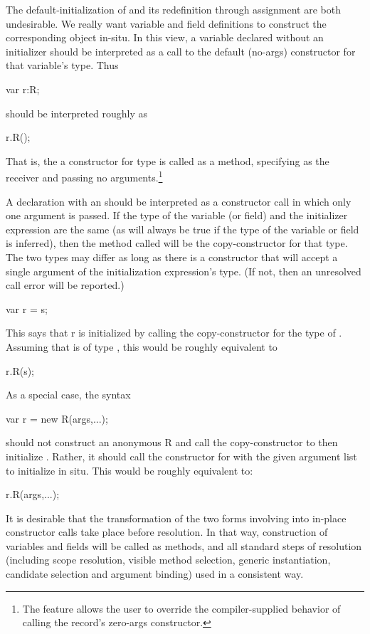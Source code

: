 The default-initialization of  and its
redefinition through assignment are both undesirable.  We really want variable and field
definitions to construct the corresponding object in-situ.  In this view, a variable
declared without an initializer should be interpreted as a call to the default (no-args)
constructor for that variable's type.  Thus
\begin{chapel}
var r:R;
\end{chapel}
\noindent
should be interpreted roughly as
\begin{chapel}
r.R();
\end{chapel}
That is, the a constructor for type  is called as a method, specifying  as
the receiver and passing no arguments.\footnote{The  feature
  allows the user to override the compiler-supplied behavior of calling the record's
  zero-args constructor.}

A declaration with an  should be interpreted as a constructor call
in which only one argument is passed.  If the type of the variable (or field) and the initializer
expression are the same (as will always be true if the type of the variable or field is
inferred), then the method called will be the copy-constructor for that type.  The two
types may differ as long as there is a constructor that will accept a single argument of
the initialization expression's type.  (If not, then an unresolved call error will be
reported.)
\begin{chapel}
var r = s;
\end{chapel}
This says that r is initialized by calling the copy-constructor for the type of .
Assuming that  is of type , this would be roughly equivalent to
\begin{chapel}
r.R(s);
\end{chapel}

As a special case, the syntax
\begin{chapel}
var r = new R(args,...);
\end{chapel}
\noindent
should not construct an anonymous R and call the copy-constructor to then initialize
.  Rather, it should call the constructor for  with the given argument
list to initialize  in situ.  This would be roughly equivalent to:
\begin{chapel}
r.R(args,...);
\end{chapel}

It is desirable that the transformation of the two forms involving \chpl{=} into in-place
constructor calls take place before resolution.  In that way, construction of variables
and fields will be called as methods, and all standard steps of resolution (including
scope resolution, visible method selection, generic instantiation, candidate selection and
argument binding) used in a consistent way.

